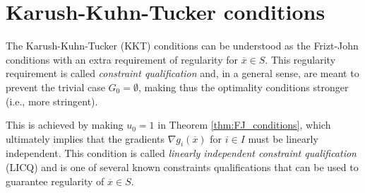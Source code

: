  
\section{Karush-Kuhn-Tucker conditions}
\label{p2c7:sec:KKT}

The Karush-Kuhn-Tucker (KKT) conditions can be understood as the Frizt-John conditions with an extra requirement of regularity for $\overline{x} \in S$. This regularity requirement is called \emph{constraint qualification} and, in a general sense, are meant to prevent the trivial case $G_0 = \emptyset$, making thus the optimality conditions stronger (i.e., more stringent).

This is achieved by making $u_0 = 1$ in Theorem \ref{thm:FJ_conditions}, which ultimately implies that the gradients $\nabla g_i(\overline{x})$ for $i \in I$ must be linearly independent. This condition is called \emph{linearly independent constraint qualification} (LICQ) and is one of several known constraints qualifications that can be used to guarantee regularity of $\overline{x} \in S$. 

